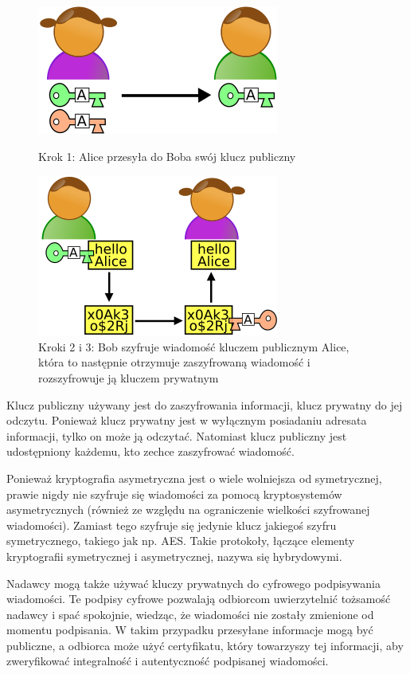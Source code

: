 \documentclass[a4paper,12pt,oneside]{book}
\begin{document}
				\begin{figure}[h]
					\centering\includegraphics[scale=0.45]{krypt_asym_1.png}
					\caption{Krok 1: Alice przesyła do Boba swój klucz publiczny}
					
					\hspace{5pt}
					
					\centering\includegraphics[scale=0.45]{krypt_asym_2.png}
					\caption{Kroki 2 i 3: Bob szyfruje wiadomość kluczem publicznym Alice, która to następnie otrzymuje zaszyfrowaną wiadomość i rozszyfrowuje ją kluczem prywatnym}
				\end{figure}
				
				Klucz publiczny używany jest do zaszyfrowania informacji, klucz prywatny do jej odczytu. Ponieważ klucz prywatny jest w wyłącznym posiadaniu adresata informacji, tylko on może ją odczytać. Natomiast klucz publiczny jest udostępniony każdemu, kto zechce zaszyfrować wiadomość.
				
				Ponieważ kryptografia asymetryczna jest o wiele wolniejsza od symetrycznej, prawie nigdy nie szyfruje się wiadomości za pomocą kryptosystemów asymetrycznych (również ze względu na ograniczenie wielkości szyfrowanej wiadomości). Zamiast tego szyfruje się jedynie klucz jakiegoś szyfru symetrycznego, takiego jak np. AES. Takie protokoły, łączące elementy kryptografii symetrycznej i asymetrycznej, nazywa się hybrydowymi.
				
				Nadawcy mogą także używać kluczy prywatnych do cyfrowego podpisywania wiadomości. Te podpisy cyfrowe pozwalają odbiorcom uwierzytelnić tożsamość nadawcy i spać spokojnie, wiedząc, że wiadomości nie zostały zmienione od momentu podpisania. W takim przypadku przesyłane informacje mogą być publiczne, a odbiorca może użyć certyfikatu, który towarzyszy tej informacji, aby zweryfikować integralność i autentyczność podpisanej wiadomości.
				
\end{document}
